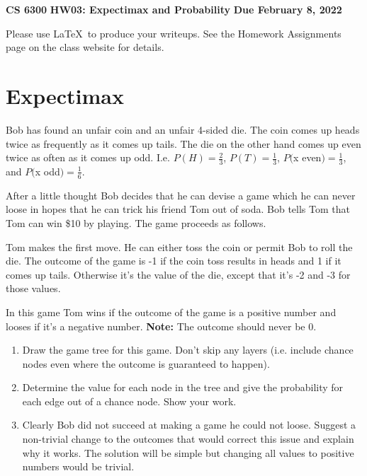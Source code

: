 \documentclass[12pt]{article}
\begin{document}
\begin{center}
  {\bf CS 6300} \hfill {\large\bf HW03: Expectimax and Probability} \hfill {\bf Due February 8, 2022}
\end{center}

Please use \LaTeX\ to produce your writeups. See the Homework
Assignments page on the class website for details.

\section{Expectimax}

Bob has found an unfair coin and an unfair 4-sided die. The coin comes
up heads twice as frequently as it comes up tails. The die on the
other hand comes up even twice as often as it comes up odd. I.e. $P(H)
= \frac{2}{3}$, $P(T) = \frac{1}{3}$, $P($x even$) = \frac{1}{3}$, and
$P($x odd$) = \frac{1}{6}$.

After a little thought Bob decides that he can devise a game which he
can never loose in hopes that he can trick his friend Tom out of
soda. Bob tells Tom that Tom can win \$10 by playing. The game
proceeds as follows.

Tom makes the first move. He can either toss the coin or permit Bob to
roll the die. The outcome of the game is -1 if the coin toss results
in heads and 1 if it comes up tails. Otherwise it's the value of the
die, except that it's -2 and -3 for those values. 

In this game Tom wins if the outcome of the game is a positive number
and looses if it's a negative number. \textbf{Note:} The outcome
should never be 0.

\begin{enumerate}

\item Draw the game tree for this game. Don't skip any layers
  (i.e. include chance nodes even where the outcome is guaranteed to
  happen).

\item Determine the value for each node in the tree and give the
    probability for each edge out of a chance node. Show your work.

\item Clearly Bob did not succeed at making a game he could not
    loose. Suggest a non-trivial change to the outcomes that would
    correct this issue and explain why it works. The solution will be
    simple but changing all values to positive numbers would be
    trivial.

\end{enumerate}
\end{document}
